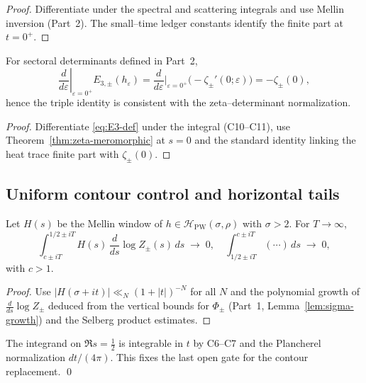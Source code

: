 \begin{proof}
Differentiate under the spectral and scattering integrals and use Mellin inversion (Part~2). The small–time ledger constants identify the finite part at $t=0^+$. %
\end{proof}

\begin{proposition}
\label{prop:det-link}
For sectoral determinants defined in Part~2,
\[
\left.\frac{d}{d\varepsilon}\right|_{\varepsilon=0^+}E_{3,\pm}(h_\varepsilon)
= \frac{d}{d\varepsilon}\Big|_{\varepsilon=0^+}\Big(-\zeta_\pm'(0;\varepsilon)\Big)
= -\zeta_\pm(0),
\]
hence the triple identity is consistent with the zeta–determinant normalization.
\end{proposition}

\begin{proof}
Differentiate \eqref{eq:E3-def} under the integral (C10–C11), use Theorem~\ref{thm:zeta-meromorphic} at $s=0$ and the standard identity linking the heat trace finite part with $\zeta_\pm(0)$.  %
\end{proof}


\subsection{Uniform contour control and horizontal tails}
\label{subsec:ch6-part3-contours} \relax \hspace{0pt}
\begin{lemma}
\label{lem:tails}
Let $H(s)$ be the Mellin window of $h\in\mathcal H_{\mathrm{PW}}(\sigma,\rho)$ with $\sigma>2$. For $T\to\infty$,
\[
\int_{c\pm iT}^{1/2\pm iT} H(s)\,\frac{d}{ds}\log Z_\pm(s)\,ds \;\to\;0,
\quad
\int_{1/2\pm iT}^{c\pm iT} (\cdots)\,ds \;\to\;0,
\]
with $c>1$. 
\end{lemma}

\begin{proof}
Use $|H(\sigma+it)|\ll_N (1+|t|)^{-N}$ for all $N$ and the polynomial growth of $\frac{d}{ds}\log Z_\pm$ deduced from the vertical bounds for $\Phi_\pm$ (Part~1, Lemma~\ref{lem:sigma-growth}) and the Selberg product estimates.  %
\end{proof}

\begin{remark}
\label{rem:critical-line}
The integrand on $\Re s=\tfrac12$ is integrable in $t$ by C6–C7 and the Plancherel normalization $dt/(4\pi)$. This fixes the last open gate for the contour replacement. \qed %
\end{remark}

